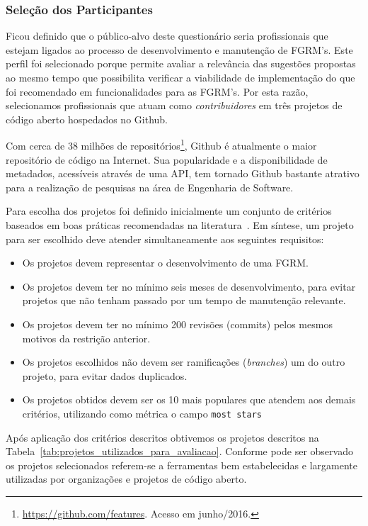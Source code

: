 \subsubsection{Seleção dos Participantes}
\label{ssub:sug_melhoria_selecao_participantes}

Ficou definido que o público-alvo deste questionário seria profissionais que
estejam ligados ao processo de desenvolvimento e manutenção de FGRM's. Este
perfil foi selecionado porque permite avaliar a relevância das sugestões
propostas ao mesmo tempo que possibilita verificar a viabilidade de
implementação do que foi recomendado em funcionalidades para as FGRM's. Por esta
razão, selecionamos profissionais que atuam como \textit{contribuidores} em três
projetos de código aberto hospedados no Github.

Com cerca de 38 milhões de
repositórios\footnote{\url{https://github.com/features}. Acesso em junho/2016.},
Github é atualmente o maior repositório de código na Internet. Sua popularidade
e a disponibilidade de metadados, acessíveis através de uma API, tem tornado
Github bastante atrativo para a realização de pesquisas na área de Engenharia de
Software.

Para escolha dos projetos foi definido inicialmente um conjunto de critérios
baseados em boas práticas recomendadas na literatura~\cite{Bird2009}. Em
síntese, um projeto para ser escolhido deve atender simultaneamente
aos seguintes requisitos:

\begin{itemize}
	\item Os projetos devem representar o desenvolvimento de uma FGRM\@.
	\item Os projetos devem ter no mínimo seis meses de desenvolvimento, para
		evitar projetos que não tenham passado por um tempo de manutenção
		relevante.
	\item Os projetos devem  ter  no  mínimo  200  revisões (commits)  pelos
		mesmos motivos  da restrição anterior.
	\item Os projetos escolhidos não devem ser ramificações (\textsl{branches}) um
		do outro projeto, para evitar dados duplicados.
	\item Os projetos obtidos devem ser os 10 mais populares que atendem aos
		demais critérios, utilizando como métrica o campo \texttt{most stars}
\end{itemize}

Após aplicação dos critérios descritos obtivemos os projetos descritos na
Tabela~\ref{tab:projetos_utilizados_para_avaliacao}. Conforme pode ser observado
os projetos selecionados referem-se a ferramentas bem estabelecidas e largamente
utilizadas por organizações e projetos de código aberto.

